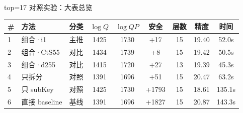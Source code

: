 \documentclass[aspectratio=169, 10pt, xcolor=svgnames, table, UTF8]{ctexbeamer}
\begin{document}
\begin{frame}{top=17 对照实验：大表总览}
  \begin{center}
    \begin{tabular}{@{}llccccccc@{}}
      \toprule
      \# & 方法 & 分类 & \(\log Q\) & \(\log QP\) & 安全 & 层数 & 精度 & 时间 \\
      \midrule
      \alert{1} & \alert{组合·i1} & \alert{主推} & 1425 & 1730 & +17 & 15 & \alert{19.40} & 52.0s \\
      2 & 组合·CtS55 & 对比 & 1434 & 1739 & +8 & 15 & 19.42 & 50.5s \\
      3 & 组合·d255 & 对比 & 1415 & 1720 & +27 & 13 & 19.39 & 45.3s \\
      4 & 只拆分 & 对照 & 1391 & 1696 & +51 & 15 & 20.47 & 63.2s \\
      5 & 只 subKey & 对照 & 1425 & 1730 & +1793 & 15 & 18.61 & 135.1s \\
      6 & 直接 baseline & 基线 & 1391 & 1696 & +1827 & 15 & 20.87 & 143.3s \\
      \bottomrule
    \end{tabular}
  \end{center}
  
  \vspace{0.2cm}
  
\end{frame}
\end{document}

